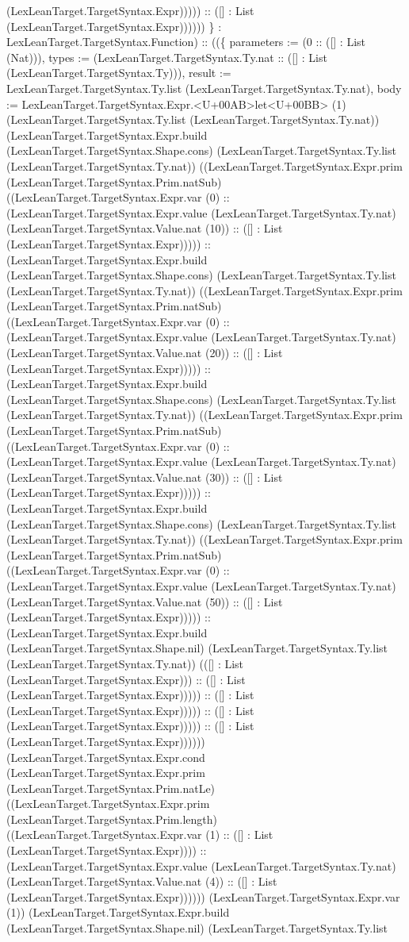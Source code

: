 \documentclass[11pt]{article}
\begin{document}
(LexLeanTarget.TargetSyntax.Expr))))) :: ([] : List (LexLeanTarget.TargetSyntax.Expr)))))) \} : LexLeanTarget.TargetSyntax.Function) :: ((\{ parameters := (0 :: ([] : List (Nat))), types := (LexLeanTarget.TargetSyntax.Ty.nat :: ([] : List (LexLeanTarget.TargetSyntax.Ty))), result := LexLeanTarget.TargetSyntax.Ty.list (LexLeanTarget.TargetSyntax.Ty.nat), body := LexLeanTarget.TargetSyntax.Expr.<U+00AB>let<U+00BB> (1) (LexLeanTarget.TargetSyntax.Ty.list (LexLeanTarget.TargetSyntax.Ty.nat)) (LexLeanTarget.TargetSyntax.Expr.build (LexLeanTarget.TargetSyntax.Shape.cons) (LexLeanTarget.TargetSyntax.Ty.list (LexLeanTarget.TargetSyntax.Ty.nat)) ((LexLeanTarget.TargetSyntax.Expr.prim (LexLeanTarget.TargetSyntax.Prim.natSub) ((LexLeanTarget.TargetSyntax.Expr.var (0) :: (LexLeanTarget.TargetSyntax.Expr.value (LexLeanTarget.TargetSyntax.Ty.nat) (LexLeanTarget.TargetSyntax.Value.nat (10)) :: ([] : List (LexLeanTarget.TargetSyntax.Expr))))) :: (LexLeanTarget.TargetSyntax.Expr.build (LexLeanTarget.TargetSyntax.Shape.cons) (LexLeanTarget.TargetSyntax.Ty.list (LexLeanTarget.TargetSyntax.Ty.nat)) ((LexLeanTarget.TargetSyntax.Expr.prim (LexLeanTarget.TargetSyntax.Prim.natSub) ((LexLeanTarget.TargetSyntax.Expr.var (0) :: (LexLeanTarget.TargetSyntax.Expr.value (LexLeanTarget.TargetSyntax.Ty.nat) (LexLeanTarget.TargetSyntax.Value.nat (20)) :: ([] : List (LexLeanTarget.TargetSyntax.Expr))))) :: (LexLeanTarget.TargetSyntax.Expr.build (LexLeanTarget.TargetSyntax.Shape.cons) (LexLeanTarget.TargetSyntax.Ty.list (LexLeanTarget.TargetSyntax.Ty.nat)) ((LexLeanTarget.TargetSyntax.Expr.prim (LexLeanTarget.TargetSyntax.Prim.natSub) ((LexLeanTarget.TargetSyntax.Expr.var (0) :: (LexLeanTarget.TargetSyntax.Expr.value (LexLeanTarget.TargetSyntax.Ty.nat) (LexLeanTarget.TargetSyntax.Value.nat (30)) :: ([] : List (LexLeanTarget.TargetSyntax.Expr))))) :: (LexLeanTarget.TargetSyntax.Expr.build (LexLeanTarget.TargetSyntax.Shape.cons) (LexLeanTarget.TargetSyntax.Ty.list (LexLeanTarget.TargetSyntax.Ty.nat)) ((LexLeanTarget.TargetSyntax.Expr.prim (LexLeanTarget.TargetSyntax.Prim.natSub) ((LexLeanTarget.TargetSyntax.Expr.var (0) :: (LexLeanTarget.TargetSyntax.Expr.value (LexLeanTarget.TargetSyntax.Ty.nat) (LexLeanTarget.TargetSyntax.Value.nat (50)) :: ([] : List (LexLeanTarget.TargetSyntax.Expr))))) :: (LexLeanTarget.TargetSyntax.Expr.build (LexLeanTarget.TargetSyntax.Shape.nil) (LexLeanTarget.TargetSyntax.Ty.list (LexLeanTarget.TargetSyntax.Ty.nat)) (([] : List (LexLeanTarget.TargetSyntax.Expr))) :: ([] : List (LexLeanTarget.TargetSyntax.Expr))))) :: ([] : List (LexLeanTarget.TargetSyntax.Expr))))) :: ([] : List (LexLeanTarget.TargetSyntax.Expr))))) :: ([] : List (LexLeanTarget.TargetSyntax.Expr)))))) (LexLeanTarget.TargetSyntax.Expr.cond (LexLeanTarget.TargetSyntax.Expr.prim (LexLeanTarget.TargetSyntax.Prim.natLe) ((LexLeanTarget.TargetSyntax.Expr.prim (LexLeanTarget.TargetSyntax.Prim.length) ((LexLeanTarget.TargetSyntax.Expr.var (1) :: ([] : List (LexLeanTarget.TargetSyntax.Expr)))) :: (LexLeanTarget.TargetSyntax.Expr.value (LexLeanTarget.TargetSyntax.Ty.nat) (LexLeanTarget.TargetSyntax.Value.nat (4)) :: ([] : List (LexLeanTarget.TargetSyntax.Expr)))))) (LexLeanTarget.TargetSyntax.Expr.var (1)) (LexLeanTarget.TargetSyntax.Expr.build (LexLeanTarget.TargetSyntax.Shape.nil) (LexLeanTarget.TargetSyntax.Ty.list 
\end{document}

